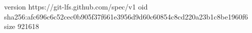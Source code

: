 version https://git-lfs.github.com/spec/v1
oid sha256:afc696c6c52cec0b905f37f661e3956d9d60c60854c8cd220a23b1c8be1960f6
size 921618
